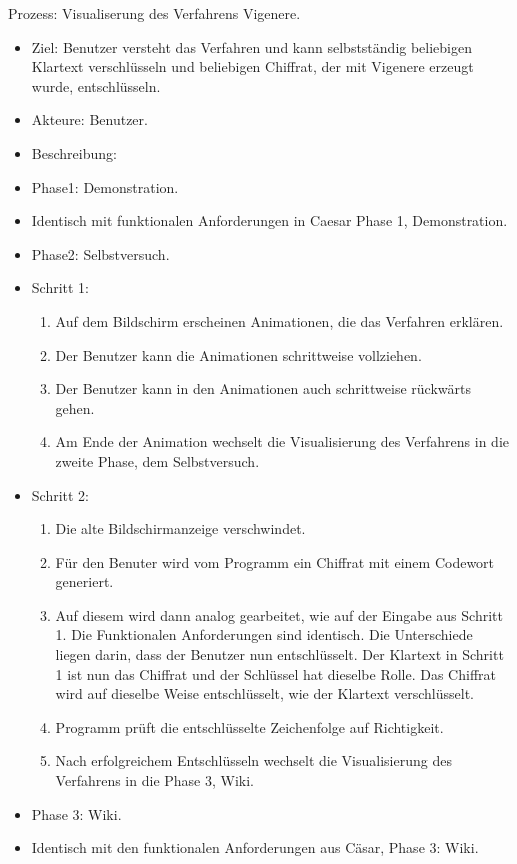 \documentclass{article}
\begin{document}
\begin{FA}[start=120]
 \item Prozess: Visualiserung des Verfahrens Vigenere.
\end{FA}
\begin{itemize}[label={}]
 \item Ziel: Benutzer versteht das Verfahren und kann selbstständig beliebigen Klartext verschlüsseln und beliebigen Chiffrat, 
       der mit Vigenere erzeugt wurde, entschlüsseln.
 \item Akteure: Benutzer.
 \item Beschreibung:
 \item Phase1: Demonstration.
 \item Identisch mit funktionalen Anforderungen in Caesar Phase 1, Demonstration. 
 \item Phase2: Selbstversuch.
 \item Schritt 1:
 \begin{enumerate}
  \item Auf dem Bildschirm erscheinen Animationen, die das Verfahren erklären.
  \item Der Benutzer kann die Animationen schrittweise vollziehen.
  \item Der Benutzer kann in den Animationen auch schrittweise rückwärts gehen. 
  \item Am Ende der Animation wechselt die Visualisierung des Verfahrens in die zweite Phase, dem Selbstversuch.
 \end{enumerate}
 \item Schritt 2:
 \begin{enumerate}
  \item Die alte Bildschirmanzeige verschwindet.
  \item Für den Benuter wird vom Programm ein Chiffrat mit einem Codewort generiert. 
  \item[] Auf diesem wird dann analog gearbeitet, wie auf der Eingabe aus Schritt 1. Die Funktionalen Anforderungen sind identisch.
        Die Unterschiede liegen darin, dass der Benutzer nun entschlüsselt. 
        Der Klartext in Schritt 1 ist nun das Chiffrat und der Schlüssel hat dieselbe Rolle.
        Das Chiffrat wird auf dieselbe Weise entschlüsselt, wie der Klartext verschlüsselt. 
  \item Programm prüft die entschlüsselte Zeichenfolge auf Richtigkeit.
  \item Nach erfolgreichem Entschlüsseln wechselt die Visualisierung des Verfahrens in die Phase 3, Wiki.
 \end{enumerate}
 \item Phase 3: Wiki.
 \item Identisch mit den funktionalen Anforderungen aus Cäsar, Phase 3: Wiki.
\end{itemize}
\end{document}
